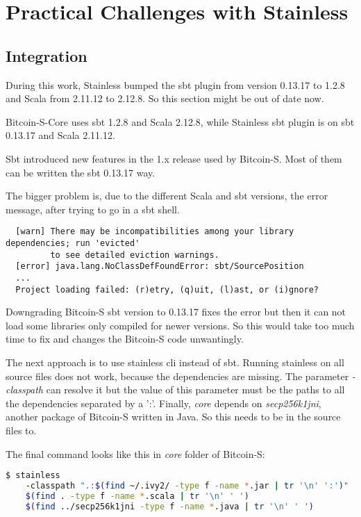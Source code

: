 \chapter{Practical Challenges with Stainless}
\label{chap:appendix_arb}
\endgroup


\section{Integration}

During this work, Stainless bumped the sbt plugin from version 0.13.17 to 1.2.8 and Scala from 2.11.12 to 2.12.8.
So this section might be out of date now.

Bitcoin-S-Core uses sbt 1.2.8 and Scala 2.12.8, while Stainless sbt plugin is on sbt 0.13.17 and Scala 2.11.12.

Sbt introduced new features in the 1.x release used by Bitcoin-S.
Most of them can be written the sbt 0.13.17 way.

The bigger problem is, due to the different Scala and sbt versions, the error message, after trying to go in a sbt shell.
\begin{verbatim}
  [warn] There may be incompatibilities among your library dependencies; run 'evicted'
         to see detailed eviction warnings.
  [error] java.lang.NoClassDefFoundError: sbt/SourcePosition
  ...
  Project loading failed: (r)etry, (q)uit, (l)ast, or (i)gnore?
\end{verbatim}

Downgrading Bitcoin-S sbt version to 0.13.17 fixes the error but then it can not load some libraries only compiled for newer versions.
So this would take too much time to fix and changes the Bitcoin-S code unwantingly.

The next approach is to use stainless cli instead of sbt.
Running stainless on all source files does not work, because the dependencies are missing.
The parameter \emph{-classpath} can resolve it but the value of this parameter must be the paths to all the dependencies separated by a ':'.
Finally, \emph{core} depends on \emph{secp256k1jni}, another package of Bitcoin-S written in Java.
So this needs to be in the source files to.

The final command looks like this in \emph{core} folder of Bitcoin-S:
\begin{lstlisting}[language=bash]
  $ stainless
    -classpath ".:$(find ~/.ivy2/ -type f -name *.jar | tr '\n' ':')"
    $(find . -type f -name *.scala | tr '\n' ' ')
    $(find ../secp256k1jni -type f -name *.java | tr '\n' ' ')
\end{lstlisting}

